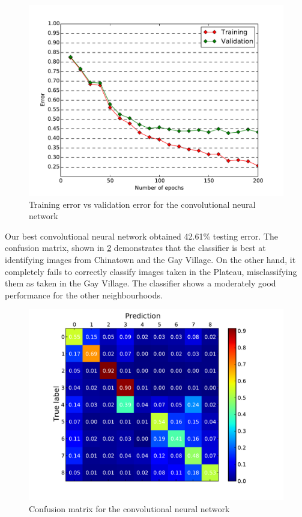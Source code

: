 \documentclass{acm_proc_article-sp}
\begin{document}
\begin{figure}[h!]
\includegraphics[width=\linewidth]{convnet_learning.pdf}
		\caption{Training error vs validation error for the convolutional neural network}
		\label{fig:convnet_trainvsvalid}
\end{figure}

Our best convolutional neural network obtained 42.61\% testing error. The confusion matrix, shown in \ref{fig:convnet_confusion} demonstrates that the classifier is best at identifying images from Chinatown and the Gay Village. On the other hand, it completely fails to correctly classify images taken in the Plateau, misclassifying them as taken in the Gay Village. The classifier shows a moderately good performance for the other neighbourhoods.

\begin{figure}[h!]
\includegraphics[width=\linewidth]{convnet_confusion.pdf}
		\caption{Confusion matrix for the convolutional neural network}
		\label{fig:convnet_confusion}
\end{figure}
\end{document}
